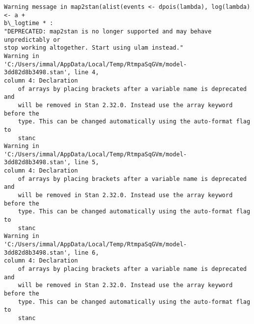 \documentclass[11pt]{article}
\begin{document}
    \begin{Verbatim}[commandchars=\\\{\}]
Warning message in map2stan(alist(events <- dpois(lambda), log(lambda) <- a +
b\_logtime * :
"DEPRECATED: map2stan is no longer supported and may behave unpredictably or
stop working altogether. Start using ulam instead."
Warning in
'C:/Users/immal/AppData/Local/Temp/RtmpaSqGVm/model-3dd82d8b3498.stan', line 4,
column 4: Declaration
    of arrays by placing brackets after a variable name is deprecated and
    will be removed in Stan 2.32.0. Instead use the array keyword before the
    type. This can be changed automatically using the auto-format flag to
    stanc
Warning in
'C:/Users/immal/AppData/Local/Temp/RtmpaSqGVm/model-3dd82d8b3498.stan', line 5,
column 4: Declaration
    of arrays by placing brackets after a variable name is deprecated and
    will be removed in Stan 2.32.0. Instead use the array keyword before the
    type. This can be changed automatically using the auto-format flag to
    stanc
Warning in
'C:/Users/immal/AppData/Local/Temp/RtmpaSqGVm/model-3dd82d8b3498.stan', line 6,
column 4: Declaration
    of arrays by placing brackets after a variable name is deprecated and
    will be removed in Stan 2.32.0. Instead use the array keyword before the
    type. This can be changed automatically using the auto-format flag to
    stanc


    \end{Verbatim}
\end{document}
